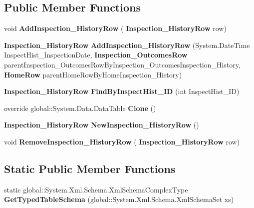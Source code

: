 \subsection*{Public Member Functions}
\begin{DoxyCompactItemize}
\item 
\mbox{\label{class_a_f_h___scheduler_1_1_home_inspection_db_data_set_1_1_inspection___history_data_table_a255c87b191ca065583c03b7ceaf97c44}} 
void {\bfseries Add\+Inspection\+\_\+\+History\+Row} (\textbf{ Inspection\+\_\+\+History\+Row} row)
\item 
\mbox{\label{class_a_f_h___scheduler_1_1_home_inspection_db_data_set_1_1_inspection___history_data_table_a19a92b92af1eb00d0caa1acd7b71fbee}} 
\textbf{ Inspection\+\_\+\+History\+Row} {\bfseries Add\+Inspection\+\_\+\+History\+Row} (System.\+Date\+Time Inspect\+Hist\+\_\+\+Inspection\+Date, \textbf{ Inspection\+\_\+\+Outcomes\+Row} parent\+Inspection\+\_\+\+Outcomes\+Row\+By\+Inspection\+\_\+\+Outcomes\+Inspection\+\_\+\+History, \textbf{ Home\+Row} parent\+Home\+Row\+By\+Home\+Inspection\+\_\+\+History)
\item 
\mbox{\label{class_a_f_h___scheduler_1_1_home_inspection_db_data_set_1_1_inspection___history_data_table_adf59580df9defc24a3fa3b061bbd3ba7}} 
\textbf{ Inspection\+\_\+\+History\+Row} {\bfseries Find\+By\+Inspect\+Hist\+\_\+\+ID} (int Inspect\+Hist\+\_\+\+ID)
\item 
\mbox{\label{class_a_f_h___scheduler_1_1_home_inspection_db_data_set_1_1_inspection___history_data_table_acaff3b174c4068119736503f75e520dd}} 
override global\+::\+System.\+Data.\+Data\+Table {\bfseries Clone} ()
\item 
\mbox{\label{class_a_f_h___scheduler_1_1_home_inspection_db_data_set_1_1_inspection___history_data_table_ab199cde396af8c99578fb3d84ebb331e}} 
\textbf{ Inspection\+\_\+\+History\+Row} {\bfseries New\+Inspection\+\_\+\+History\+Row} ()
\item 
\mbox{\label{class_a_f_h___scheduler_1_1_home_inspection_db_data_set_1_1_inspection___history_data_table_abc26197b6d618d48e6b1905e6c0882e2}} 
void {\bfseries Remove\+Inspection\+\_\+\+History\+Row} (\textbf{ Inspection\+\_\+\+History\+Row} row)
\end{DoxyCompactItemize}
\subsection*{Static Public Member Functions}
\begin{DoxyCompactItemize}
\item 
\mbox{\label{class_a_f_h___scheduler_1_1_home_inspection_db_data_set_1_1_inspection___history_data_table_a40c1f8344f069949a826a0e6be176306}} 
static global\+::\+System.\+Xml.\+Schema.\+Xml\+Schema\+Complex\+Type {\bfseries Get\+Typed\+Table\+Schema} (global\+::\+System.\+Xml.\+Schema.\+Xml\+Schema\+Set xs)
\end{DoxyCompactItemize}

